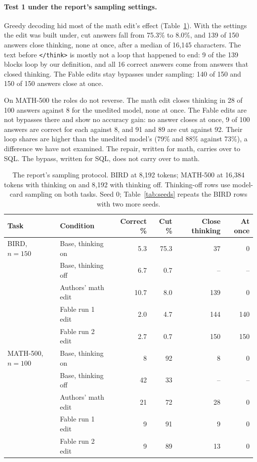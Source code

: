 \documentclass[11pt]{article}
\newcommand{\think}{\texttt{</think>}}
\begin{document}
\paragraph{Test 1 under the report's sampling settings.} Greedy decoding hid most of the math edit's effect (Table~\ref{tab:samp}). With the settings the edit was built under, cut answers fall from 75.3\% to 8.0\%, and 139 of 150 answers close thinking, none at once, after a median of 16,145 characters. The text before \think{} is mostly not a loop that happened to end: 9 of the 139 blocks loop by our definition, and all 16 correct answers come from answers that closed thinking. The Fable edits stay bypasses under sampling: 140 of 150 and 150 of 150 answers close at once.

On MATH-500 the roles do not reverse. The math edit closes thinking in 28 of 100 answers against 8 for the unedited model, none at once. The Fable edits are not bypasses there and show no accuracy gain: no answer closes at once, 9 of 100 answers are correct for each against 8, and 91 and 89 are cut against 92. Their loop shares are higher than the unedited model's (79\% and 88\% against 73\%), a difference we have not examined. The repair, written for math, carries over to SQL. The bypass, written for SQL, does not carry over to math.

\begin{table}[h]\centering\small
\begin{tabular}{llrrrr}
\toprule
Task & Condition & Correct \% & Cut \% & Close thinking & At once \\
\midrule
BIRD, $n{=}150$ & Base, thinking on & 5.3 & 75.3 & 37 & 0 \\
 & Base, thinking off & 6.7 & 0.7 & -- & -- \\
 & Authors' math edit & 10.7 & 8.0 & 139 & 0 \\
 & Fable run 1 edit & 2.0 & 4.7 & 144 & 140 \\
 & Fable run 2 edit & 2.7 & 0.7 & 150 & 150 \\
\midrule
MATH-500, $n{=}100$ & Base, thinking on & 8 & 92 & 8 & 0 \\
 & Base, thinking off & 42 & 33 & -- & -- \\
 & Authors' math edit & 21 & 72 & 28 & 0 \\
 & Fable run 1 edit & 9 & 91 & 9 & 0 \\
 & Fable run 2 edit & 9 & 89 & 13 & 0 \\
\bottomrule
\end{tabular}
\caption{The report's sampling protocol. BIRD at 8,192 tokens; MATH-500 at 16,384 tokens with thinking on and 8,192 with thinking off. Thinking-off rows use model-card sampling on both tasks. Seed 0; Table~\ref{tab:seeds} repeats the BIRD rows with two more seeds.}
\label{tab:samp}
\end{table}
\end{document}
